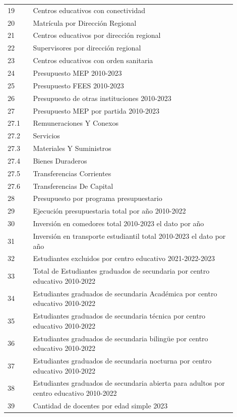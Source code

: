 \documentclass{article}
\begin{document}
\begin{multicols}{6}[]
\begin{center}
\begin{tabular}{p{0.1\linewidth}p{0.8\linewidth}}
		19 & Centros educativos con conectividad \\
		20 & Matr\'icula por Direcci\'on Regional \\
		21 & Centros educativos por direcci\'on regional \\
		22 & Supervisores por direcci\'on regional \\
		23 & Centros educativos con orden sanitaria \\
		24 & Presupuesto MEP 2010-2023 \\
		25 & Presupuesto FEES 2010-2023 \\
		26 & Presupuesto de otras instituciones 2010-2023 \\
		27 & Presupuesto MEP por partida 2010-2023 \\
		27.1 & Remuneraciones Y Conexos \\
		27.2 & Servicios \\
		27.3 & Materiales Y Suministros \\
		27.4 & Bienes Duraderos \\
		27.5 & Transferencias Corrientes \\
		27.6 & Transferencias De Capital \\
		28 & Presupuesto por programa presupuestario \\
		29 & Ejecuci\'on presupuestaria total por a\~no 2010-2022 \\
		30 & Inversi\'on en comedores total 2010-2023 el dato por a\~no \\
		31 & Inversi\'on en transporte estudiantil total 2010-2023 el dato por a\~no \\
		32 & Estudiantes excluidos por centro educativo 2021-2022-2023 \\
		33 & Total de Estudiantes graduados de secundaria por centro educativo 2010-2022 \\
		34 & Estudiantes graduados de secundaria Acad\'emica por centro educativo 2010-2022 \\
		35 & Estudiantes graduados de secundaria t\'ecnica por centro educativo 2010-2022 \\
		36 & Estudiantes graduados de secundaria biling\"ue por centro educativo 2010-2022 \\
		37 & Estudiantes graduados de secundaria nocturna por centro educativo 2010-2022 \\
		38 & Estudiantes graduados de secundaria abierta para adultos por centro educativo 2010-2022 \\
		39 & Cantidad de docentes por edad simple 2023 \\

\end{tabular}
\end{center}
\end{multicols}
\end{document}
